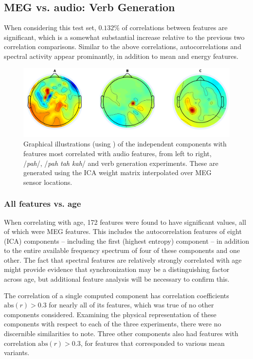 \documentclass[utf8]{frontiersSCNS} %
\begin{document}
\subsection{MEG vs. audio: Verb Generation}

When considering this test set, $0.132$\% of correlations between features are significant, which is a somewhat substantial increase relative to the previous two correlation comparisons. Similar to the above correlations, autocorrelations and spectral activity appear prominantly, in addition to mean and energy features. 

\begin{figure}[t]
  \centering
  \includegraphics[width=\linewidth]{AllComponents.png}
  \caption{Graphical illustrations (using \cite{Delorme04eeglab}) of the independent components with features most correlated with audio features, from left to right, /{\em pah}/, /{\em pah tah kah}/ and verb generation experiments. These are generated using the ICA weight matrix interpolated over MEG sensor locations. }
  \label{fig:components}
\end{figure}
 
\subsubsection{All features vs. age}

When correlating with age, 172 features were found to have significant values, all of which were MEG features. This includes the autocorrelation features of eight (ICA) components -- including the first (highest entropy) component -- in addition to the entire available frequency spectrum of four of these components and one other. The fact that spectral features are relatively strongly correlated with age might provide evidence that synchronization may be a distinguishing factor across age, but additional feature analysis will be necessary to confirm this.

The correlation of a single computed component has correlation coefficients $\text{abs}(r)>0.3$ for nearly all of its features, which was true of no other components considered. Examining the physical representation of these components with respect to each of the three experiments, there were no discernible similarities to note. Three other components also had features with correlation $\text{abs}(r)>0.3$, for features that corresponded to various mean variants.
\end{document}
